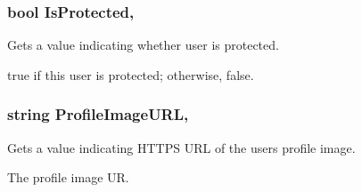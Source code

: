\subsubsection[{Is\+Protected}]{\setlength{\rightskip}{0pt plus 5cm}bool Is\+Protected\hspace{0.3cm}{\ttfamily [get]}, {}}\label{class_voxel_busters_1_1_native_plugins_1_1_twitter_user_a230cd87f736815fe5dfe96ba6adf3b5e}


Gets a value indicating whether user is protected. 

{\ttfamily true} if this user is protected; otherwise, {\ttfamily false}.\hypertarget{class_voxel_busters_1_1_native_plugins_1_1_twitter_user_ae3ee0ac1ef3df0593fec9086106c541b}{}
\subsubsection[{Profile\+Image\+U\+R\+L}]{\setlength{\rightskip}{0pt plus 5cm}string Profile\+Image\+U\+R\+L\hspace{0.3cm}{\ttfamily [get]}, {}}\label{class_voxel_busters_1_1_native_plugins_1_1_twitter_user_ae3ee0ac1ef3df0593fec9086106c541b}


Gets a value indicating H\+T\+T\+P\+S U\+R\+L of the user\textquotesingle{}s profile image. 

The profile image U\+R.